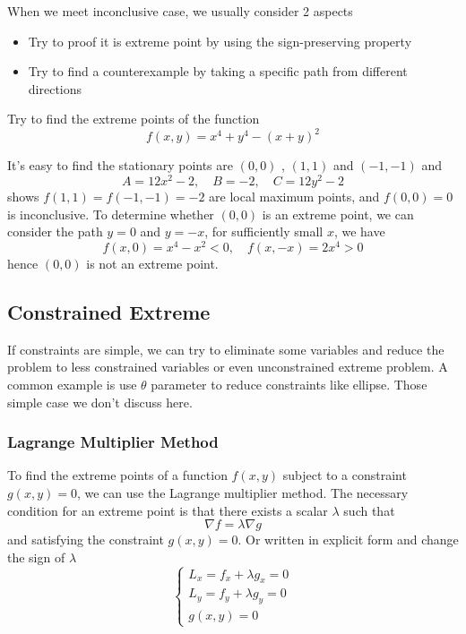 \documentclass[a4]{overview}
\begin{document}
When we meet inconclusive case, we usually consider 2 aspects
\begin{itemize}
	\item Try to proof it is extreme point by using the sign-preserving property
	\item Try to find a counterexample by taking a specific path from different directions
\end{itemize}
\begin{example}
	Try to find the extreme points of the function
	\[
	f(x,y) = x^4+y^4 - (x+y)^2
	\]
	\begin{answer}
		It's easy to find the stationary points are $(0,0)$ , $(1,1)$ and $(-1,-1)$
		and
		\[
		A = 12x^2-2,\quad B=-2,\quad C=12y^2-2
		\] 
		shows $f(1,1)=f(-1,-1)=-2$ are local maximum points, and $f(0,0)=0$ is inconclusive.
		To determine whether $(0,0)$ is an extreme point, we can consider the path $y=0$ and $y=-x$,
		for sufficiently small $x$, we have
		\[
		f(x,0) = x^4-x^2<0,\quad f(x,-x) = 2x^4>0
		\] 
		hence $(0,0)$ is not an extreme point.
	\end{answer}
\end{example}
\subsection{Constrained Extreme}

If constraints are simple, we can try to eliminate some variables and reduce the
problem to less constrained variables or even unconstrained extreme problem. 
A common example is use $\theta$ parameter to reduce constraints like ellipse.
Those simple case we don't discuss here.

\subsubsection{Lagrange Multiplier Method}

To find the extreme points of a function $f(x,y)$ subject to a constraint $g(x,y)=0$, 
we can use the Lagrange multiplier method. The necessary condition for an extreme
point is that there exists a scalar $\lambda$ such that
\[
\nabla f = \lambda \nabla g
\] 
and satisfying the constraint $g(x,y)=0$. Or written in explicit form and change the 
sign of $\lambda$ 
\[
	\begin{cases}
		L_x = f_x + \lambda g_x = 0\\
		L_y = f_y + \lambda g_y = 0\\
		g(x,y) = 0
	\end{cases}
\] 
\end{document}
